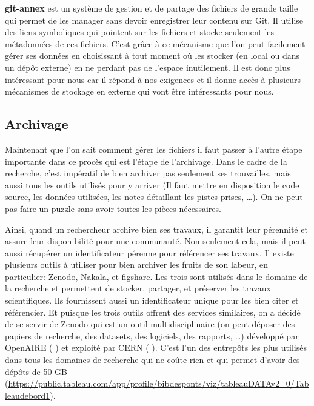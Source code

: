 \documentclass[11pt]{article}
\begin{document}
\textbf{git-annex} est un système de gestion et de partage des fichiers de
grande taille qui permet de les manager sans devoir enregistrer leur
contenu sur Git. Il utilise des liens symboliques qui pointent sur les
fichiers et stocke seulement les métadonnées de ces fichiers. C'est
grâce à ce mécanisme que l'on peut facilement gérer ses données en
choisissant à tout moment où les stocker (en local ou dans un dépôt
externe) en ne perdant pas de l'espace inutilement.
Il est donc plus intéressant pour nous car il répond à nos exigences
et il donne accès à plusieurs mécanismes de stockage en externe qui
vont être intéressants pour nous.

\subsection{Archivage}
\label{sec:org6c7732a}
Maintenant que l'on sait comment gérer les fichiers il faut passer à
l'autre étape importante dans ce procès qui est l'étape de
l'archivage. Dans le cadre de la recherche, c’est impératif de bien
archiver pas seulement ses trouvailles, mais aussi tous les outils
utilisés pour y arriver (Il faut mettre en disposition le code source,
les données utilisées, les notes détaillant les pistes prises, …). On
ne peut pas faire un puzzle sans avoir toutes les pièces
nécessaires.

Ainsi, quand un rechercheur archive bien ses travaux, il
garantit leur pérennité et assure leur disponibilité pour une
communauté. Non seulement cela, mais il peut aussi récupérer un
identificateur pérenne pour référencer ses travaux. Il existe
plusieurs outils à utiliser pour bien archiver les fruits de son
labeur, en particulier: Zenodo, Nakala, et figshare. Les trois sont
utilisés dans le domaine de la recherche et permettent de stocker,
partager, et préserver les travaux scientifiques. Ils fournissent
aussi un identificateur unique pour les bien citer et référencier.  Et
puisque les trois outils offrent des services similaires, on a décidé
de se servir de Zenodo qui est un outil multidisciplinaire (on peut
déposer des papiers de recherche, des datasets, des logiciels, des
rapports, \ldots{}) développé par OpenAIRE ( ) et exploité par CERN ( ).
C’est l’un des entrepôts les plus utilisés dans tous les domaines de
recherche qui ne coûte rien et qui permet d’avoir des dépôts de 50 GB
(\url{https://public.tableau.com/app/profile/bibdesponts/viz/tableauDATAv2\_0/Tableaudebord1}).
\end{document}
